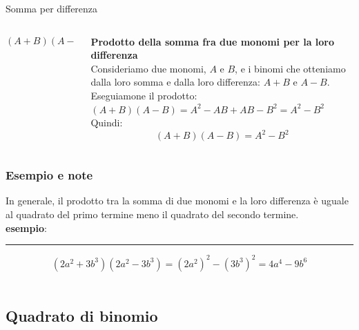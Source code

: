 \documentclass[10pt, aspectratio=169]{beamer}
\begin{document}
\begin{frame}{Somma per differenza}
    \begin{columns}
        
        \begin{column}{0.5\textwidth}
            \Large{$$ (A+B)(A-B) = A^2 - B^2$$}
        \end{column}

        \begin{column}{0.5\textwidth}
        {\textbf{Prodotto della somma fra due monomi per la loro differenza}}\\[10pt]

        \small{Consideriamo due monomi, $A$ e $B$, e i binomi che otteniamo dalla loro somma e dalla loro differenza: $A+B$ e $A-B$.\\
        Eseguiamone il prodotto: $(A+B)(A-B)=A^2-A B+A B-B^2=A^2-B^2$\\ [10pt]
        Quindi:}
$$
(A+B)(A-B)=A^2-B^2
$$

        \end{column}
    \end{columns}
\end{frame}

\begin{frame}
    \frametitle{Esempio e note}

    In generale, il prodotto tra la somma di due monomi e la loro differenza è uguale al quadrato del primo termine meno il quadrato del secondo termine. \\[10pt]
\textbf{esempio}:
\hrule

$$\left(2 a^2+3 b^3\right)\left(2 a^2-3 b^3\right)=\left(2 a^2\right)^2-\left(3 b^3\right)^2=4 a^4-9 b^6$$\\ 

\end{frame}



\subsection{Quadrato di binomio}
\end{document}
